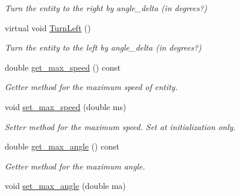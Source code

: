 \begin{DoxyCompactItemize}
\begin{DoxyCompactList}\small\item\em Turn the entity to the right by angle\+\_\+delta (in degrees?) \end{DoxyCompactList}\item 
virtual void \hyperlink{classMotionHandler_a922e3dd8c6a98b54607837c5e669c557}{Turn\+Left} ()\hypertarget{classMotionHandler_a922e3dd8c6a98b54607837c5e669c557}{}\label{classMotionHandler_a922e3dd8c6a98b54607837c5e669c557}

\begin{DoxyCompactList}\small\item\em Turn the entity to the left by angle\+\_\+delta (in degrees?) \end{DoxyCompactList}\item 
double \hyperlink{classMotionHandler_a4024f3b5562b5e49bfaeab9f82c0762b}{get\+\_\+max\+\_\+speed} () const \hypertarget{classMotionHandler_a4024f3b5562b5e49bfaeab9f82c0762b}{}\label{classMotionHandler_a4024f3b5562b5e49bfaeab9f82c0762b}

\begin{DoxyCompactList}\small\item\em Getter method for the maximum speed of entity. \end{DoxyCompactList}\item 
void \hyperlink{classMotionHandler_a32e832d35e73e9db85c16b3ff569196e}{set\+\_\+max\+\_\+speed} (double ms)\hypertarget{classMotionHandler_a32e832d35e73e9db85c16b3ff569196e}{}\label{classMotionHandler_a32e832d35e73e9db85c16b3ff569196e}

\begin{DoxyCompactList}\small\item\em Setter method for the maximum speed. Set at initialization only. \end{DoxyCompactList}\item 
double \hyperlink{classMotionHandler_a55eb7aeb355b6ee86b2bd8751fde6cb5}{get\+\_\+max\+\_\+angle} () const \hypertarget{classMotionHandler_a55eb7aeb355b6ee86b2bd8751fde6cb5}{}\label{classMotionHandler_a55eb7aeb355b6ee86b2bd8751fde6cb5}

\begin{DoxyCompactList}\small\item\em Getter method for the maximum angle. \end{DoxyCompactList}\item 
void \hyperlink{classMotionHandler_aa73973c705626f1f95ac59391f23bcc9}{set\+\_\+max\+\_\+angle} (double ma)\hypertarget{classMotionHandler_aa73973c705626f1f95ac59391f23bcc9}{}\label{classMotionHandler_aa73973c705626f1f95ac59391f23bcc9}


\end{DoxyCompactItemize}
